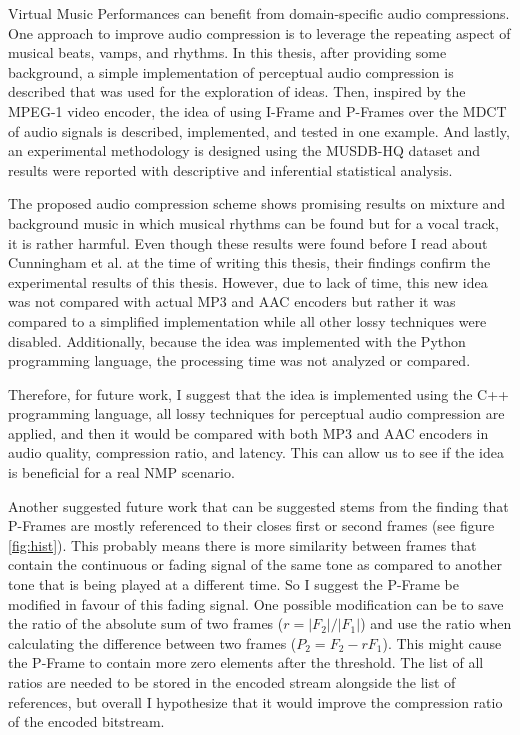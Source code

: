 \label{chapter:concl}

Virtual Music Performances can benefit from domain-specific audio compressions. One approach to improve audio compression is to leverage the repeating aspect of musical beats, vamps, and rhythms. In this thesis, after providing some background, a simple implementation of perceptual audio compression is described that was used for the exploration of ideas. Then, inspired by the MPEG-1 video encoder, the idea of using I-Frame and P-Frames over the MDCT of audio signals is described, implemented, and tested in one example. And lastly, an experimental methodology is designed using the MUSDB-HQ dataset and results were reported with descriptive and inferential statistical analysis.

The proposed audio compression scheme shows promising results on mixture and background music in which musical rhythms can be found but for a vocal track, it is rather harmful. Even though these results were found before I read about Cunningham et al. at the time of writing this thesis, their findings confirm the experimental results of this thesis. However, due to lack of time, this new idea was not compared with actual MP3 and AAC encoders but rather it was compared to a simplified implementation while all other lossy techniques were disabled. Additionally, because the idea was implemented with the Python programming language, the processing time was not analyzed or compared.

Therefore, for future work, I suggest that the idea is implemented using the C++ programming language, all lossy techniques for perceptual audio compression are applied, and then it would be compared with both MP3 and AAC encoders in audio quality, compression ratio, and latency. This can allow us to see if the idea is beneficial for a real NMP scenario.

Another suggested future work that can be suggested stems from the finding that P-Frames are mostly referenced to their closes first or second frames (see figure \ref{fig:hist}). This probably means there is more similarity between frames that contain the continuous or fading signal of the same tone as compared to another tone that is being played at a different time. So I suggest the P-Frame be modified in favour of this fading signal. One possible modification can be to save the ratio of the absolute sum of two frames ($r = |F_2|/|F_1|$) and use the ratio when calculating the difference between two frames ($P_2=F_2-rF_1$). This might cause the P-Frame to contain more zero elements after the threshold. The list of all ratios are needed to be stored in the encoded stream alongside the list of references, but overall I hypothesize that it would improve the compression ratio of the encoded bitstream. 




